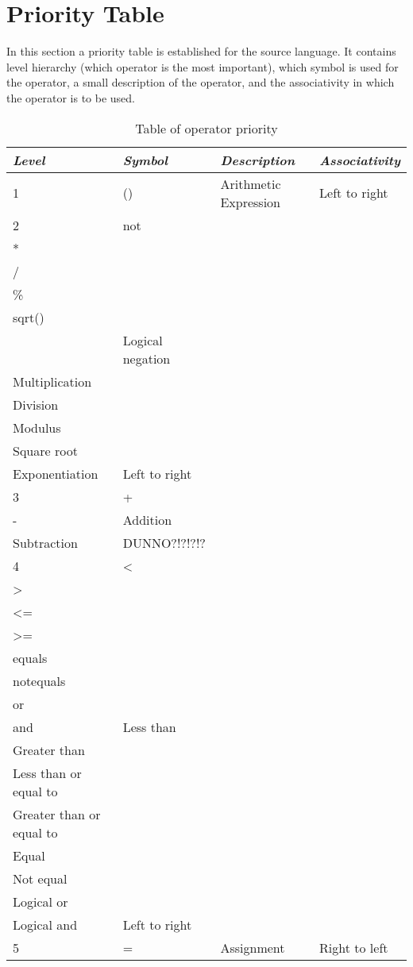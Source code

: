 \section{Priority Table}
In this section a priority table is established for the source language. It contains level hierarchy (which operator is the most important), which symbol is used for the operator, a small description of the operator, and the associativity in which the operator is to be used.
\begin{table}[H]
	\begin{tabular}{|l|l|l|l|}
	\hline
	\emph{Level} & \emph{Symbol} & \emph{Description} & \emph{Associativity} \\ 
 		\hline
 		1 & () & Arithmetic Expression & Left to right \\
 		\hline
 		2 & not \\ * \\ / \\ \% \\ sqrt() \\ $^{}$ & Logical negation \\ Multiplication \\ Division \\ Modulus \\ Square root \\ Exponentiation & Left to right \\
 		\hline
 		3 & + \\ - & Addition \\ Subtraction & DUNNO?!?!?!? \\
 		\hline
 		4 & < \\ > \\ <= \\ >= \\ equals \\ notequals \\ or \\ and & Less than \\ Greater than \\ Less than or equal to \\ Greater than or equal to \\ Equal \\ Not equal \\ Logical or \\ Logical and & Left to right \\
 		\hline
 		5 & = & Assignment & Right to left \\
	\end{tabular}
	\label{tab:priority}
	\caption{Table of operator priority}
\end{table} 
